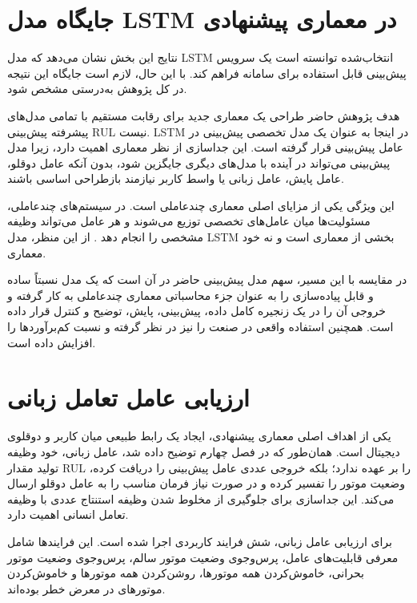 \section{جایگاه مدل LSTM در معماری پیشنهادی}
\label{sec:lstm-role}

نتایج این بخش نشان می‌دهد که مدل LSTM انتخاب‌شده توانسته است یک سرویس پیش‌بینی قابل استفاده برای سامانه فراهم کند. با این ‌حال، لازم است جایگاه این نتیجه در کل پژوهش به‌درستی مشخص شود.

هدف پژوهش حاضر طراحی یک معماری جدید برای رقابت مستقیم با تمامی مدل‌های پیشرفته پیش‌بینی \gls{RUL} نیست. LSTM در اینجا به عنوان یک مدل تخصصی پیش‌بینی در عامل پیش‌بینی قرار گرفته است. این جداسازی از نظر معماری اهمیت دارد، زیرا مدل پیش‌بینی می‌تواند در آینده با مدل‌های دیگری جایگزین شود، بدون آنکه عامل دوقلو، عامل پایش، عامل زبانی یا واسط کاربر نیازمند بازطراحی اساسی باشند.

این ویژگی یکی از مزایای اصلی معماری چندعاملی است. در سیستم‌های چندعاملی، مسئولیت‌ها میان عامل‌های تخصصی توزیع می‌شوند و هر عامل می‌تواند وظیفه مشخصی را انجام دهد \cite{dorri2018multiagent,pretel2022masdt,lopez2024madtwin}. از این منظر، مدل LSTM بخشی از معماری است و نه خود معماری.


در مقایسه با این مسیر، سهم مدل پیش‌بینی حاضر در آن است که یک مدل نسبتاً ساده و قابل پیاده‌سازی را به عنوان جزء محاسباتی معماری چندعاملی به کار گرفته و خروجی آن را در یک زنجیره کامل داده، پیش‌بینی، پایش، توضیح و کنترل قرار داده است. همچنین استفاده واقعی در صنعت را نیز در نظر گرفته و نسبت کم‌برآورد‌ها را افزایش داده است.

\section{ارزیابی عامل تعامل زبانی}
\label{sec:llm-evaluation}

یکی از اهداف اصلی معماری پیشنهادی، ایجاد یک رابط طبیعی میان کاربر و دوقلوی دیجیتال است. همان‌طور که در فصل چهارم توضیح داده شد، عامل زبانی، خود وظیفه تولید مقدار \gls{RUL} را بر عهده ندارد؛ بلکه خروجی عددی عامل پیش‌بینی را دریافت کرده، وضعیت موتور را تفسیر کرده و در صورت نیاز فرمان مناسب را به عامل دوقلو ارسال می‌کند. این جداسازی برای جلوگیری از مخلوط شدن وظیفه استنتاج عددی با وظیفه تعامل انسانی اهمیت دارد.

برای ارزیابی عامل زبانی، شش فرایند کاربردی اجرا شده است. این فرایند‌ها شامل معرفی قابلیت‌های عامل، پرس‌وجوی وضعیت موتور سالم، پرس‌وجوی وضعیت موتور بحرانی، خاموش‌کردن همه موتورها، روشن‌کردن همه موتورها و خاموش‌کردن موتورهای در معرض خطر بوده‌اند.

